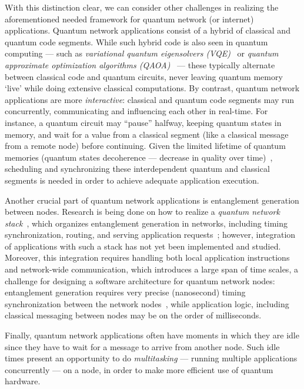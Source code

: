 With this distinction clear, we can consider other challenges in realizing the aforementioned needed framework for quantum network (or internet) applications.
Quantum network applications consist of a hybrid of classical and quantum code segments.
While such hybrid code is also seen in quantum computing --- such as \textit{variational quantum eigensolvers (VQE)}~\cite{diadamo2021distributed, liu2022layer} or \textit{quantum approximate optimization algorithms (QAOA)}~\cite{farhi2014quantum} ---
these typically alternate between classical code and quantum circuits, never leaving quantum memory `live' while doing extensive classical computations.
By contrast, quantum network applications are more \textit{interactive}: classical and quantum code segments may run concurrently, communicating and influencing each other in real-time.
For instance, a quantum circuit may ``pause'' halfway, keeping quantum states in memory, and wait for a value from a classical segment (like a classical message from a remote node) before continuing.
Given the limited lifetime of quantum memories (quantum states decoherence --- decrease in quality over time)~\cite{shor_scheme_1995}, scheduling and synchronizing these interdependent quantum and classical segments is needed in order to achieve adequate application execution.

Another crucial part of quantum network applications is entanglement generation between nodes.
Research is being done on how to realize a \emph{quantum network stack}~\cite{dahlberg2019linklayer,kozlowski2020networklayer, caleffi_2017_optimal}, which organizes entanglement generation in networks, including timing synchronization, routing, and serving application requests~\cite{gauthier_control_2023};
however, integration of applications with such a stack has not yet been implemented and studied.
Moreover, this integration requires handling both local application instructions and network-wide communication, which introduces a large span of time scales, a challenge for designing a software architecture for quantum network nodes: entanglement generation requires very precise (nanosecond) timing synchronization between the network nodes~\cite{dahlberg2019link}, while application logic, including classical messaging between nodes may be on the order of milliseconds.

Finally, quantum network applications often have moments in which they are idle since they have to wait for a message to arrive from another node.
Such idle times present an opportunity to do \emph{multitasking} --- running multiple applications concurrently --- on a node, in order to make more efficient use of quantum hardware.


